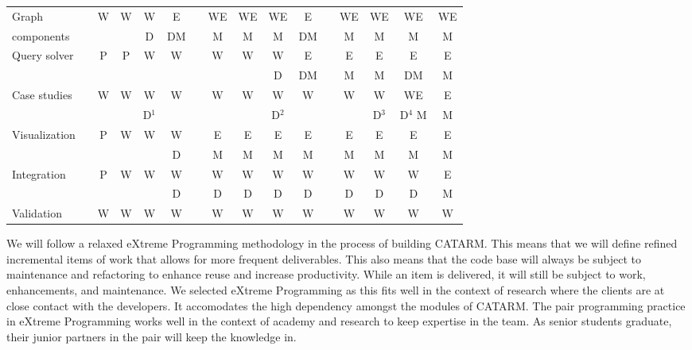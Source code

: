 \documentclass[12pt]{article}
\begin{document}
\begin{table}[bt]
\begin{tabular}{lp{.1cm}ccccp{.1cm}ccccp{.1cm}cccc}
Graph  & & 
W & W & W & E & & WE & WE & WE & E & & WE & WE & WE & WE \\ 
components & & 
 &  & D & DM & & M & M & M & DM & & M & M & M & M \\ \hline

\multirow{2}{*}{Query solver} & & 
P & P & W & W & & W & W & W & E & & E & E & E & E \\ 
& & 
 &  &  &  & &  &  & D & DM & & M & M & DM & M \\ \hline

\multirow{2}{*}{Case studies} & & 
W & W & W & W & & W & W & W & W & & W & W & WE & E \\ 
& & 
 &  & D$^1$ &  & &  &  & D$^2$ &  & &  & D$^3$ & D$^4$ M & M \\ \hline

\multirow{2}{*}{Visualization} & & 
P & W & W & W & & E & E & E & E & & E & E & E & E \\ 
& & 
 &  &  & D & & M & M & M & M & & M & M & M & M \\ \hline

\multirow{2}{*}{Integration} & & 
P & W & W & W & & W & W & W & W & & W & W & W & E \\ 
& & 
 &  &  & D & & D & D & D & D & & D & D & D & M \\  \hline

Validation & & 
W & W & W & W & & W & W & W & W & & W & W & W & W \\  \bottomrule
\end{tabular}
\normalsize
\label{t:workplan}
\end{table}

We will follow a relaxed  eXtreme Programming 
methodology in the process of building CATARM.
This means that we will define refined incremental items of 
work that allows for more frequent deliverables. 
This also means that the code base will always be subject
to maintenance and refactoring to enhance reuse and 
increase productivity. 
While an item is delivered, it will still be subject to work,
enhancements, and maintenance. 
We selected eXtreme Programming as this fits well in the 
context of research where the clients are at close 
contact with the developers.
It accomodates the high dependency amongst the 
modules of CATARM. 
The pair programming practice in eXtreme Programming 
works well in the context of academy and research to keep
expertise in the team. 
As senior students graduate, their junior partners in the pair
will keep the knowledge in. 
\end{document}

